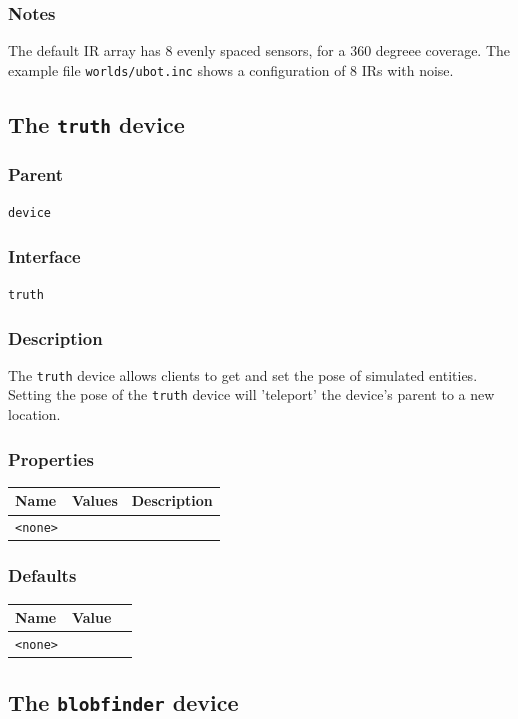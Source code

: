 \documentclass[11pt,twoside]{report}
\begin{document}
\subsubsection*{Notes}
The default IR array has 8 evenly spaced sensors, for a 360 degreee coverage. 
The example file {\tt worlds/ubot.inc} shows a configuration of 8 IRs with noise.

\newpage
\subsection{The {\tt truth} device}

\subsubsection*{Parent}
{\tt device}

\subsubsection*{Interface}
{\tt truth}

\subsubsection*{Description}
The {\tt truth} device allows clients to get and set the pose of
simulated entities.  Setting the pose of the {\tt truth} device will
'teleport' the device's parent to a new location.

\subsubsection*{Properties}
\begin{tabularx}{\columnwidth}{llX}
\hline
Name & Values & Description \\
\hline
\verb'<none>'\\
\hline
\end{tabularx}

\subsubsection*{Defaults}
\begin{tabularx}{\columnwidth}{llX}
\hline
Name & Value\\
\hline
\verb'<none>'\\
\hline
\end{tabularx}

\newpage
\subsection{The {\tt blobfinder} device}
\end{document}
